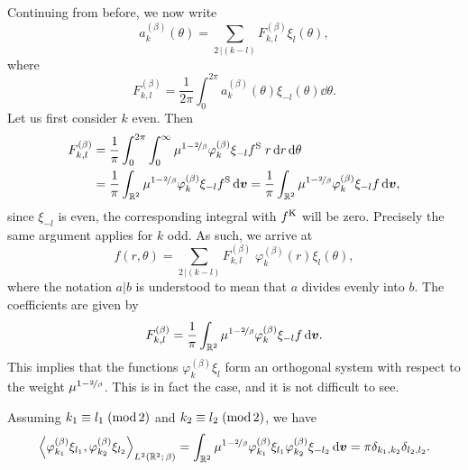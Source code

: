 Continuing from before, we now write
\[
    a_k^{(\beta)}(\theta) = \sum_{2\,|(k-l)} F_{k,l}^{(\beta)} \xi_l(\theta),
\]
where
\[
    F_{k,l}^{(\beta)} = \frac{1}{2\pi} \int_0^{2\pi} a_k^{(\beta)}(\theta) \xi_{-l}(\theta) \dd\theta.
\]
Let us first consider $k$ even. Then
\begin{align*}
    F_{k,l}^{(\beta)} &= \frac{1}{\pi} \int_0^{2\pi} \int_0^\infty \mu^{1-\nicefrac{2}{\beta}}
             \varphi_k^{(\beta)} \xi_{-l} f^{\mathrm{S}} \; r \,\mathrm{d} r \,\mathrm{d}\theta \\
          &= \frac{1}{\pi} \int_{\mathbb{R}^2} \mu^{1-\nicefrac{2}{\beta}} \varphi_k^{(\beta)}
             \xi_{-l} f^{\mathrm{S}} \,\mathrm{d} {\bm v}
           = \frac{1}{\pi} \int_{\mathbb{R}^2} \mu^{1-\nicefrac{2}{\beta}} \varphi_k^{(\beta)}
             \xi_{-l} f \,\mathrm{d} {\bm v},
\end{align*}
since $\xi_{-l}$ is even, the corresponding integral with $f^{\mathrm{K}}$ will be zero. Precisely the same argument
applies for $k$ odd. As such, we arrive at
\begin{equation} \label{eqn:polexp}
    f(r,\theta) = \sum_{2\,|(k-l)} F_{k,l}^{(\beta)} \; \varphi_k^{(\beta)} (r) \xi_l(\theta),
\end{equation}
where the notation $a|b$ is understood to mean that $a$ divides evenly into $b$. The coefficients are given by
\[
    F_{k,l}^{(\beta)} = \frac{1}{\pi} \int_{\mathbb{R}^2} \mu^{1-\nicefrac{2}{\beta}}
                        \varphi_k^{(\beta)} \xi_{-l} f \,\mathrm{d}{\bm v}.
\]
This implies that the functions $\varphi_k^{(\beta)}\xi_l$ form an orthogonal system with respect to the
weight $\mu^{1-\nicefrac{2}{\beta}}$. This is in fact the case, and it is not difficult to see.
\begin{proposition} \label{prop:orthopol}
Assuming $k_1 \equiv l_1\;(\operatorname{mod}2)$ and $k_2\equiv l_2\;(\operatorname{mod}2)$, we have
\[
    \left\langle \varphi_{k_1}^{(\beta)} \xi_{l_1}, \varphi_{k_2}^{(\beta)} \xi_{l_2}
    \right\rangle_{L^2(\mathbb{R}^2;\,\beta)}
    = \int_{\mathbb{R}^2} \mu^{1-\nicefrac{2}{\beta}}
      \varphi_{k_1}^{(\beta)} \xi_{l_1} \varphi_{k_2}^{(\beta)} \xi_{-l_2} \,\mathrm{d}{\bm v}
    = \pi \delta_{k_1,k_2} \delta_{l_2,l_2}.
\]
\end{proposition}
